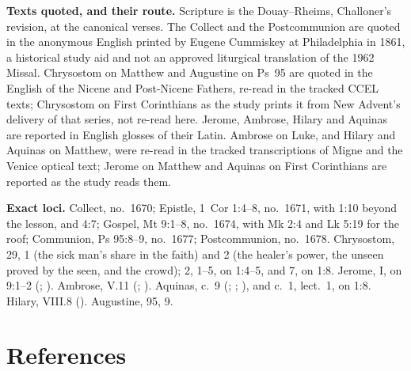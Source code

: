{\textbf{Texts quoted, and their route.} Scripture is the Douay--Rheims,
Challoner's revision, at the canonical verses. The Collect and the
Postcommunion are quoted in the anonymous English printed by Eugene
Cummiskey at Philadelphia in 1861, a historical study aid and not an approved
liturgical translation of the 1962 Missal. Chrysostom on Matthew and
Augustine on Ps~95 are quoted in the English of the Nicene and Post-Nicene
Fathers, re-read in the tracked CCEL texts; Chrysostom on
First Corinthians as the study prints it from New Advent's delivery of that
series, not re-read here. Jerome, Ambrose, Hilary and Aquinas are
reported in English glosses of their Latin. Ambrose on Luke, and Hilary and
Aquinas on Matthew, were re-read in the tracked transcriptions of Migne and
the Venice optical text; Jerome on Matthew and Aquinas on First Corinthians
are reported as the study reads them.

\textbf{Exact loci.} Collect, no.~1670; Epistle, 1~Cor 1:4--8, no.~1671, with
1:10 beyond the lesson, and 4:7; Gospel, Mt 9:1--8, no.~1674, with Mk 2:4 and
Lk 5:19 for the roof; Communion, Ps 95:8--9, no.~1677; Postcommunion, no.~1678.
Chrysostom,  29, 1 (the sick man's share in the
faith) and 2 (the healer's power, the unseen proved by the seen, and the
crowd);  2, 1--5, on 1:4--5, and 7, on
1:8.
Jerome,  I, on 9:1--2 (; ). Ambrose,  V.11 (; ). Aquinas,  c.~9 (; ; ), and  c.~1, lect.~1, on 1:8. Hilary,
 VIII.8 (). Augustine,  95, 9.

\par}

\section*{References}

